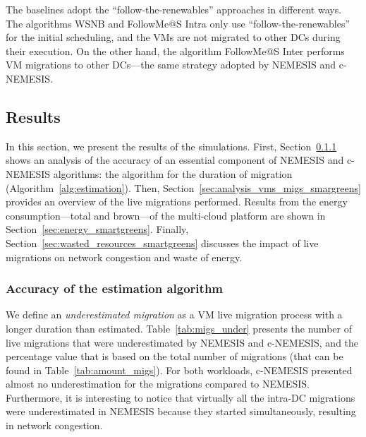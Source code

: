 The baselines adopt the ``follow-the-renewables'' approaches in different ways. The algorithms WSNB and FollowMe@S Intra only use ``follow-the-renewables'' for the initial scheduling, and the VMs are not migrated to other DCs during their execution. On the other hand, the algorithm FollowMe@S Inter performs VM migrations to other DCs---the same strategy adopted by NEMESIS and c-NEMESIS.



\subsection{Results}

\label{sec:results_smargreens}

In this section, we present the results of the simulations. First, Section~\ref{sec:accuracy_smartgreens} shows an analysis of the accuracy of an essential component of NEMESIS and c-NEMESIS algorithms: the algorithm for the duration of migration (Algorithm~\ref{alg:estimation}). Then, Section~\ref{sec:analysis_vms_migs_smargreens} provides an overview of the live migrations performed. Results from the energy consumption---total and brown---of the multi-cloud platform are shown in Section~\ref{sec:energy_smartgreens}. Finally, Section~\ref{sec:wasted_resources_smartgreens} discusses the impact of live migrations on network congestion and waste of energy.

 \subsubsection{Accuracy of the estimation algorithm}
 \label{sec:accuracy_smartgreens}
 We define an \emph{underestimated migration} as a VM live migration process with a longer duration than estimated. Table~\ref{tab:migs_under} presents the number of live migrations that were underestimated by NEMESIS and c-NEMESIS, and the percentage value that is based on the total number of migrations (that can be found in Table~\ref{tab:amount_migs}). For both workloads, c-NEMESIS presented almost no underestimation for the migrations compared to NEMESIS. Furthermore, it is interesting to notice that virtually all the intra-DC migrations were underestimated in NEMESIS because they started simultaneously, resulting in network congestion.
 
